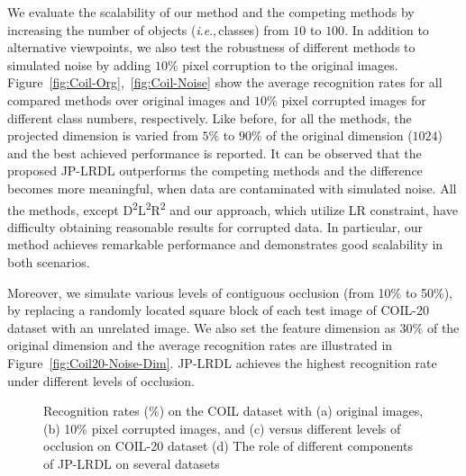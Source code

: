 \documentclass[journal]{IEEEtran}
\newcommand{\ie}{\textit{i}.\textit{e}.,\,}
\begin{document}
We evaluate the scalability of our method and the competing methods by increasing the number of objects (\ie classes) from $10$ to $100$. In addition to alternative viewpoints, we also test the robustness of different methods to simulated noise by adding $10\%$ pixel corruption to the original images.
Figure~\ref{fig:Coil-Org},~\ref{fig:Coil-Noise} show the average recognition rates for all compared methods over original images and $10\%$ pixel corrupted images for different class numbers, respectively. Like before, for all the methods, the projected dimension is varied from $5\%$ to $90\%$ of the original dimension ($1024$) and the best achieved performance is reported. 
It can be observed that the proposed JP-LRDL outperforms the competing methods and the difference becomes more meaningful, when data are contaminated with simulated noise. All the methods, except D\textsuperscript{2}L\textsuperscript{2}R\textsuperscript{2} and our approach, which utilize LR constraint, have difficulty obtaining reasonable results for corrupted data. In particular, our method achieves remarkable performance and demonstrates good scalability in both scenarios.

Moreover, we simulate various levels of contiguous occlusion (from 10\% to 50\%), by replacing a randomly located square block of each test image of COIL-20 dataset with an unrelated image. We also set the feature dimension as $30\%$ of the original dimension and the average recognition rates are illustrated in Figure~\ref{fig:Coil20-Noise-Dim}. JP-LRDL achieves the highest recognition rate under different levels of occlusion. 
\begin{figure}[t]
\centering
{}  
\hspace{2pt}
\vspace{0.2em}
\hspace{2pt}
\caption{Recognition rates (\%) on the COIL dataset with (a) original images, (b) 10\% pixel corrupted images, and (c) versus different levels of occlusion on COIL-20 dataset (d) The role of different components of JP-LRDL on several datasets}
\vspace{-1.5em}
\end{figure} 
\end{document}
